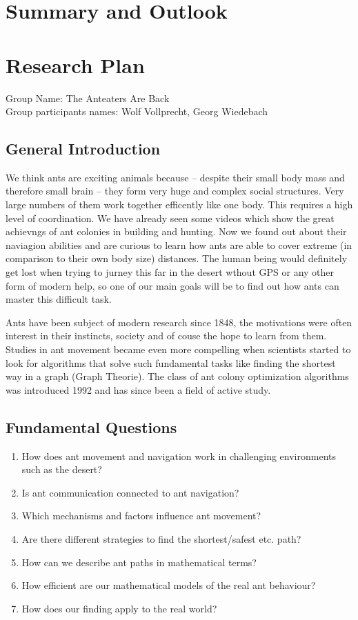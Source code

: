 \documentclass[11pt]{article}
\begin{document}
\section{Summary and Outlook}
\newpage



\appendix
\section{Research Plan}

Group Name: The Anteaters Are Back\\
Group participants names: Wolf Vollprecht, Georg Wiedebach

\subsection*{General Introduction}

We think ants are exciting animals because – despite their small body mass and therefore small brain – they form very huge and complex social structures. Very large numbers of them work together efficently like one body. This requires a high level of coordination. We have already seen some videos which show the great achievngs of ant colonies in building and hunting. Now we found out about their naviagion abilities and are curious to learn how ants are able to cover extreme (in comparison to their own body size) distances. The human being would definitely get lost when trying to jurney this far in the desert wthout GPS or any other form of modern help, so one of our main goals will be to find out how ants can master this difficult task.

Ants have been subject of modern research since 1848, the motivations were often interest in their instincts, society and of couse the hope to learn from them. Studies in ant movement became even more compelling when scientists started to look for algorithms that solve such fundamental tasks like finding the shortest way in a graph (Graph Theorie). The class of ant colony optimization algorithms was introduced 1992 and has since been a field of active study.

\subsection*{Fundamental Questions}
\begin{enumerate}
\item How does ant movement and navigation work in challenging environments such as the desert?
\item Is ant communication connected to ant navigation?
\item Which mechanisms and factors influence ant movement?
\item Are there different strategies to find the shortest/safest etc. path?
\item How can we describe ant paths in mathematical terms?
\item How efficient are our mathematical models of the real ant behaviour?
\item How does our finding apply to the real world?
\end{enumerate}
\end{document}
